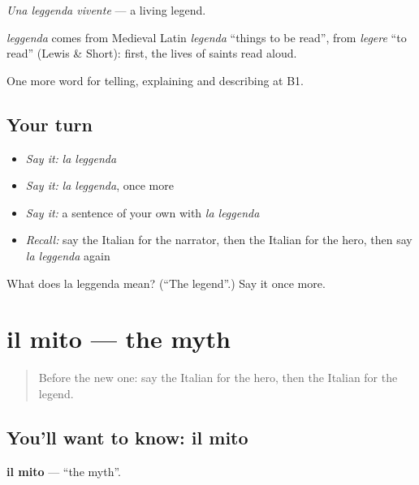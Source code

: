 \emph{Una leggenda vivente} — a living legend.

\begin{cousinweb}
\emph{leggenda} comes from Medieval Latin \emph{legenda} \textquotedblleft{}things to be read\textquotedblright{}, from \emph{legere} \textquotedblleft{}to read\textquotedblright{} (Lewis \& Short): first, the lives of saints read aloud.
\end{cousinweb}

\begin{grammarlens}[title={What you've built}]
One more word for telling, explaining and describing at B1.
\end{grammarlens}

\subsection*{Your turn}
\begin{itemize}
\raggedright
  \item \emph{Say it:} \emph{la leggenda}
  \item \emph{Say it:} \emph{la leggenda}, once more
  \item \emph{Say it:} a sentence of your own with \emph{la leggenda}
  \item \emph{Recall:} say the Italian for the narrator, then the Italian for the hero, then say \emph{la leggenda} again
\end{itemize}

\begin{tcolorbox}[breakable,colback=teal!4,colframe=teal!35!black,title={Before you move on}]
What does la leggenda mean? (\textquotedblleft{}The legend\textquotedblright{}.) Say it once more.
\end{tcolorbox}
\section[il mito]{il mito — the myth}

\label{lesson:IT-C324-mito}



\begin{quote}
Before the new one: say the Italian for the hero, then the Italian for the legend.
\end{quote}

\subsection*{You'll want to know: il mito}
\textbf{il mito} — \textquotedblleft{}the myth\textquotedblright{}.

